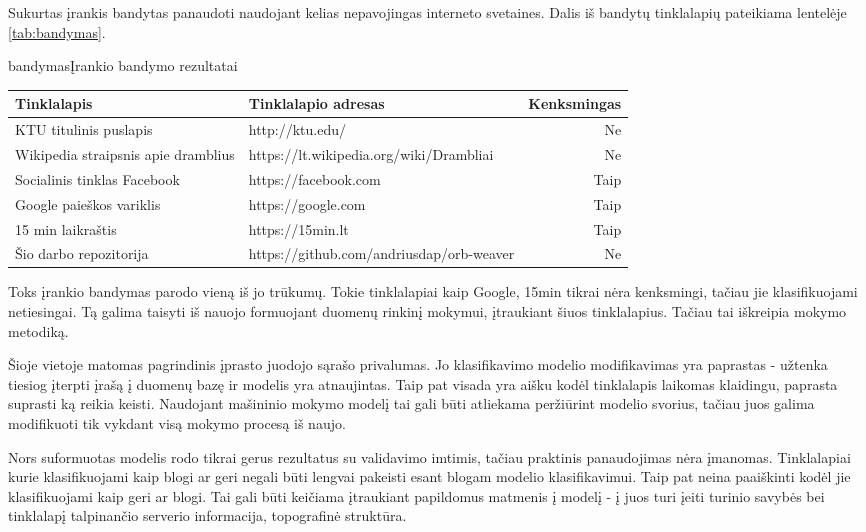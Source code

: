 
Sukurtas įrankis bandytas panaudoti naudojant kelias nepavojingas interneto svetaines. Dalis iš bandytų
tinklalapių pateikiama lentelėje \vref{tab:bandymas}.

\begin{ktutable}{bandymas}{Įrankio bandymo rezultatai}
    \begin{tabular}{|p{5 cm}|p{5 cm}|r|}
    \hline
    Tinklalapis & Tinklalapio adresas & Kenksmingas \\ \hline
    KTU titulinis puslapis & http://ktu.edu/ & Ne \\ \hline
    Wikipedia straipsnis apie dramblius & https://lt.wikipedia.org/wiki/Drambliai & Ne \\ \hline
    Socialinis tinklas Facebook & https://facebook.com & Taip \\ \hline
    Google paieškos variklis & https://google.com & Taip \\ \hline
    15 min laikraštis & https://15min.lt & Taip \\ \hline
    Šio darbo repozitorija & https://github.com/andriusdap/orb-weaver & Ne \\ \hline
    \end{tabular}
\end{ktutable}

Toks įrankio bandymas parodo vieną iš jo trūkumų. Tokie tinklalapiai kaip Google, 15min tikrai nėra kenksmingi,
tačiau jie klasifikuojami netiesingai. Tą galima taisyti iš nauojo formuojant duomenų rinkinį mokymui,
įtraukiant šiuos tinklalapius. Tačiau tai iškreipia mokymo metodiką.

Šioje vietoje matomas pagrindinis įprasto juodojo sąrašo privalumas. Jo klasifikavimo modelio modifikavimas yra
paprastas - užtenka tiesiog įterpti įrašą į duomenų bazę ir modelis yra atnaujintas. Taip pat visada yra aišku
kodėl tinklalapis laikomas klaidingu, paprasta suprasti ką reikia keisti. Naudojant mašininio mokymo modelį tai
gali būti atliekama peržiūrint modelio svorius, tačiau juos galima modifikuoti tik vykdant visą mokymo procesą iš naujo.

Nors suformuotas modelis rodo tikrai gerus rezultatus su validavimo imtimis, tačiau praktinis panaudojimas nėra
įmanomas. Tinklalapiai kurie klasifikuojami kaip blogi ar geri negali būti lengvai pakeisti esant blogam modelio
klasifikavimui. Taip pat neina paaiškinti kodėl jie klasifikuojami kaip geri ar blogi. Tai gali būti keičiama
įtraukiant papildomus matmenis į modelį - į juos turi įeiti turinio savybės bei tinklalapį talpinančio serverio
informacija, topografinė struktūra.
